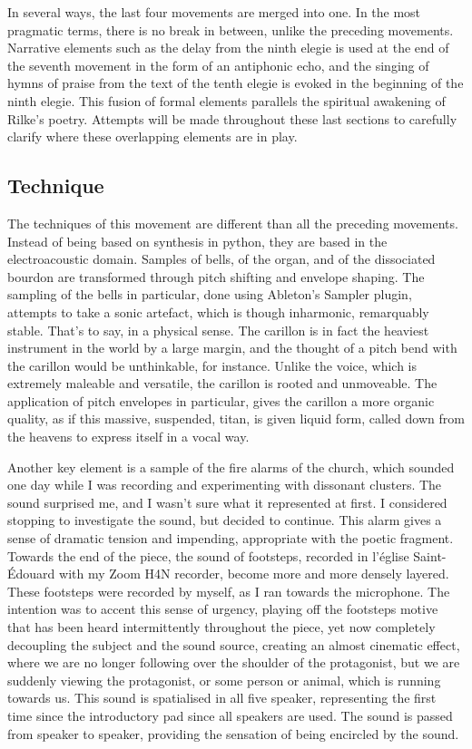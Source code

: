 \documentclass[12pt,twoside,maitrise]{dms_ks}
\theoremstyle{definition}
\begin{document}
In several ways, the last four movements are merged into one.
In the most pragmatic terms, there is no break in between, unlike the preceding movements.
Narrative elements such as the delay from the ninth elegie is used at the end of the seventh movement in the form of an antiphonic echo, and the singing of hymns of praise from the text of the tenth elegie is evoked in the beginning of the ninth elegie.
This fusion of formal elements parallels the spiritual awakening of Rilke's poetry.
Attempts will be made throughout these last sections to carefully clarify where these overlapping elements are in play.

\subsection{Technique}

The techniques of this movement are different than all the preceding movements.
Instead of being based on synthesis in python, they are based in the electroacoustic domain.
Samples of bells, of the organ, and of the dissociated bourdon are transformed through pitch shifting and envelope shaping.
The sampling of the bells in particular, done using Ableton's Sampler plugin, attempts to take a sonic artefact, which is though inharmonic, remarquably stable.
That's to say, in a physical sense.
The carillon is in fact the heaviest instrument in the world by a large margin, and the thought of a pitch bend with the carillon would be unthinkable, for instance.
Unlike the voice, which is extremely maleable and versatile, the carillon is rooted and unmoveable.
The application of pitch envelopes in particular, gives the carillon a more organic quality, as if this massive, suspended, titan, is given liquid form, called down from the heavens to express itself in a vocal way.

Another key element is a sample of the fire alarms of the church, which sounded one day while I was recording and experimenting with dissonant clusters.
The sound surprised me, and I wasn’t sure what it represented at first.
I considered stopping to investigate the sound, but decided to continue.
This alarm gives a sense of dramatic tension and impending, appropriate with the poetic fragment.
Towards the end of the piece, the sound of footsteps, recorded in l'église Saint-Édouard with my Zoom H4N recorder, become more and more densely layered.
These footsteps were recorded by myself, as I ran towards the microphone.
The intention was to accent this sense of urgency, playing off the footsteps motive that has been heard intermittently throughout the piece, yet now completely decoupling the subject and the sound source, creating an almost cinematic effect, where we are no longer following over the shoulder of the protagonist, but we are suddenly viewing the protagonist, or some person or animal, which is running towards us.
This sound is spatialised in all five speaker, representing the first time since the introductory pad since all speakers are used.
The sound is passed from speaker to speaker, providing the sensation of being encircled by the sound.
\end{document}
